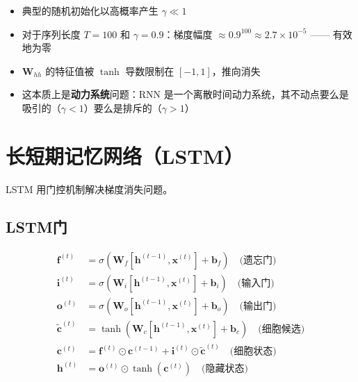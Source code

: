 \begin{properties}[为什么这在实践中很重要]
\begin{itemize}
    \item 典型的随机初始化以高概率产生 $\gamma \ll 1$ \cite{bengio1994learning}
    \item 对于序列长度 $T = 100$ 和 $\gamma = 0.9$：梯度幅度 $\approx 0.9^{100} \approx 2.7 \times 10^{-5}$ —— 有效地为零
    \item $\mathbf{W}_{hh}$ 的特征值被 $\tanh$ 导数限制在 $[-1, 1]$，推向消失
    \item 这本质上是\textbf{动力系统}问题：RNN 是一个离散时间动力系统，其不动点要么是吸引的（$\gamma < 1$）要么是排斥的（$\gamma > 1$）
\end{itemize}
\end{properties}

\section{长短期记忆网络（LSTM）}

LSTM \cite{hochreiter1997long} 用门控机制解决梯度消失问题。

\subsection{LSTM门}

\begin{align}
\mathbf{f}^{(t)} &= \sigma(\mathbf{W}_f[\mathbf{h}^{(t-1)}, \mathbf{x}^{(t)}] + \mathbf{b}_f) \quad \text{(遗忘门)} \\
\mathbf{i}^{(t)} &= \sigma(\mathbf{W}_i[\mathbf{h}^{(t-1)}, \mathbf{x}^{(t)}] + \mathbf{b}_i) \quad \text{(输入门)} \\
\mathbf{o}^{(t)} &= \sigma(\mathbf{W}_o[\mathbf{h}^{(t-1)}, \mathbf{x}^{(t)}] + \mathbf{b}_o) \quad \text{(输出门)} \\
\tilde{\mathbf{c}}^{(t)} &= \tanh(\mathbf{W}_c[\mathbf{h}^{(t-1)}, \mathbf{x}^{(t)}] + \mathbf{b}_c) \quad \text{(细胞候选)} \\
\mathbf{c}^{(t)} &= \mathbf{f}^{(t)} \odot \mathbf{c}^{(t-1)} + \mathbf{i}^{(t)} \odot \tilde{\mathbf{c}}^{(t)} \quad \text{(细胞状态)} \\
\mathbf{h}^{(t)} &= \mathbf{o}^{(t)} \odot \tanh(\mathbf{c}^{(t)}) \quad \text{(隐藏状态)}
\end{align}

